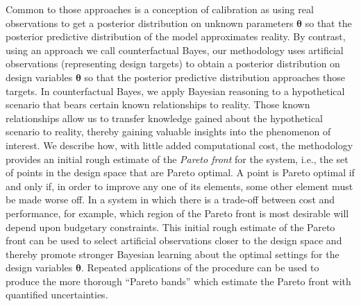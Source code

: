 \documentclass[twocolumn,10pt]{asme2ej}
\begin{document}
%
Common to those approaches is a conception of calibration as using real observations to get a posterior distribution on unknown parameters $\boldsymbol\theta$ so that the posterior predictive distribution of the model approximates reality.
%
By contrast, using an approach we call counterfactual Bayes, our methodology uses artificial observations (representing design targets) to obtain a posterior distribution on design variables $\boldsymbol\theta$ so that the posterior predictive distribution approaches those targets.
%
In counterfactual Bayes, we apply Bayesian reasoning to a hypothetical scenario that bears certain known relationships to reality.
%
Those known relationships allow us to transfer knowledge gained about the hypothetical scenario to reality, thereby gaining valuable insights into the phenomenon of interest.
%
We describe how, with little added computational cost, the methodology provides an initial rough estimate of the {\em Pareto front} for the system, i.e., the set of points in the design space that are Pareto optimal. 
%
A point is Pareto optimal if and only if, in order to improve any one of its elements, some other element must be made worse off.
%
%
In a system in which there is a trade-off between cost and performance, for example, which region of the Pareto front is most desirable will depend upon budgetary constraints.
%
This initial rough estimate of the Pareto front can be used to select artificial observations closer to the design space and thereby promote stronger Bayesian learning about the optimal settings for the design variables $\boldsymbol\theta$.
%
Repeated applications of the procedure can be used to produce the more thorough ``Pareto bands'' which estimate the Pareto front with quantified uncertainties.
%
\end{document}

